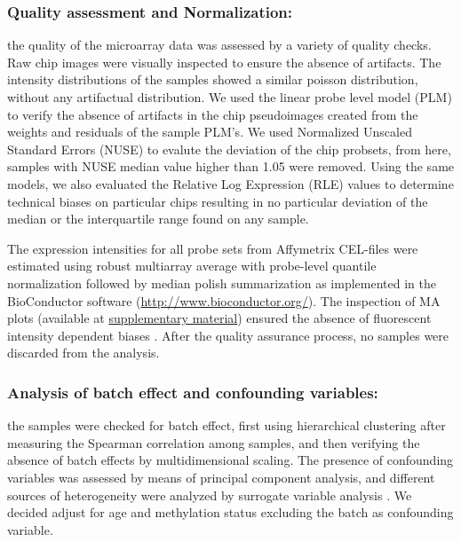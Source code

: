 \documentclass[9pt,twocolumn,twoside]{gsajnl}
\begin{document}
\subsubsection*{Quality assessment and Normalization:}
the quality of the microarray data was assessed by a variety of quality checks. Raw chip images were visually inspected to ensure the absence of  artifacts. The intensity distributions of the samples showed a similar poisson distribution, without any artifactual distribution. We used the linear probe level model (PLM) \citep{Bolstad2004, Brettschneider2007} to verify the absence of artifacts in the chip pseudoimages created from the weights and residuals of the sample PLM's. We used Normalized Unscaled Standard Errors (NUSE) \citep{Bolstad2004} to evalute the deviation of the chip probsets, from here, samples with NUSE median value higher than 1.05 were removed. Using the same models, we also evaluated the Relative Log Expression (RLE) values \citep{Bolstad2004, Brettschneider2007} to determine technical biases on particular chips resulting in no particular deviation of the median or the interquartile range found on any sample.

The expression intensities for all probe sets from Affymetrix CEL-files were estimated using robust multiarray average with probe-level quantile normalization followed by median polish summarization \citep{Irizarry2003} as implemented in the BioConductor software (\url{http://www.bioconductor.org/}). The inspection of MA plots (available at \href{http://ieoproject.tk/ieo/supplementary/workflow_report.html}{supplementary material}) ensured the absence of fluorescent intensity dependent biases \citep{Bolstad2004}. After the quality assurance process, no samples were discarded from the analysis.

\subsubsection*{Analysis of batch effect and confounding variables:}
the samples were checked for batch effect, first using hierarchical clustering after measuring the Spearman correlation among samples, and then verifying the absence of batch effects by multidimensional scaling. The presence of confounding variables was assessed by means of principal component analysis, and different sources of heterogeneity were analyzed by surrogate variable analysis \citep{Leek2007}. We decided adjust for age and methylation status \citep{Qiu2014} excluding the batch as confounding variable. 
\end{document}
